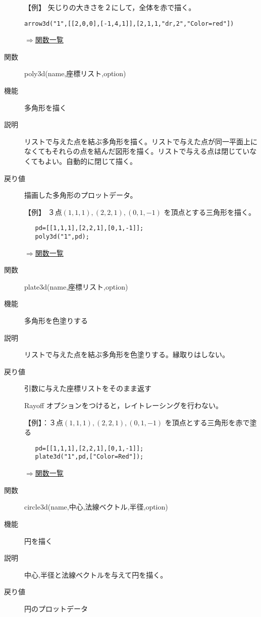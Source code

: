 \documentclass[papersize,a4paper,12pt,uplatex]{jsarticle}
\begin{document}
\begin{description}
 【例】 矢じりの大きさを２にして，全体を赤で描く。 
 
\hspace{10mm}   \verb|arrow3d("1",[[2,0,0],[-1,4,1]],[2,1,1,"dr,2","Color=red"])|

\begin{flushright} \hyperlink{functionlist}{$\Rightarrow$関数一覧}\end{flushright}

\hypertarget{poly3d}{}
\item[関数] poly3d(name,座標リスト,option)
\item[機能] 多角形を描く
\item[説明] リストで与えた点を結ぶ多角形を描く。リストで与えた点が同一平面上になくてもそれらの点を結んだ図形を描く。リストで与える点は閉じていなくてもよい。自動的に閉じて描く。
\item[戻り値] 描画した多角形のプロットデータ。


 【例】 ３点$(1,1,1) , (2,2,1),(0,1,-1)$ を頂点とする三角形を描く。
\begin{verbatim}
   pd=[[1,1,1],[2,2,1],[0,1,-1]];
   poly3d("1",pd);
\end{verbatim}

\begin{flushright} \hyperlink{functionlist}{$\Rightarrow$関数一覧}\end{flushright}

\hypertarget{plate3d}{}
\item[関数] plate3d(name,座標リスト,option)
\item[機能] 多角形を色塗りする
\item[説明] リストで与えた点を結ぶ多角形を色塗りする。縁取りはしない。
\item[戻り値] 引数に与えた座標リストをそのまま返す

 Rayoff オプションをつけると，レイトレーシングを行わない。

 【例】：３点$(1,1,1) , (2,2,1),(0,1,-1)$ を頂点とする三角形を赤で塗る 
\begin{verbatim}
   pd=[[1,1,1],[2,2,1],[0,1,-1]]; 
   plate3d("1",pd,["Color=Red"]);
\end{verbatim}

\begin{flushright} \hyperlink{functionlist}{$\Rightarrow$関数一覧}\end{flushright}

\hypertarget{circle3d}{}
\item[関数] circle3d(name,中心,法線ベクトル,半径,option)
\item[機能] 円を描く
\item[説明] 中心,半径と法線ベクトルを与えて円を描く。
\item[戻り値] 円のプロットデータ


\end{description}
\end{document}
